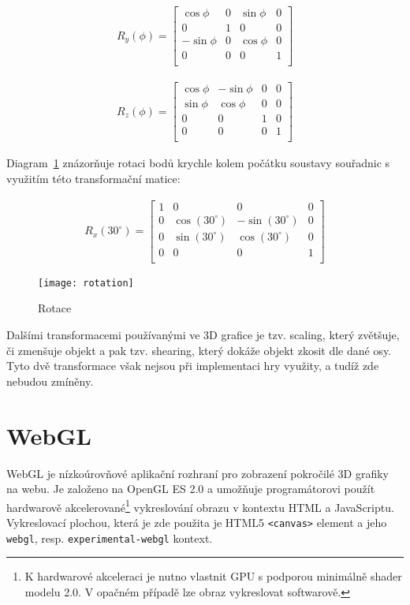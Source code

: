 \begin{align}
R_y(\phi) = 
\begin{bmatrix*}
\cos\phi & 0 & \sin\phi & 0 \\
0 & 1 & 0 & 0 \\
-\sin\phi & 0 & \cos\phi & 0 \\
0 & 0 & 0 & 1 \\
\end{bmatrix*}
\end{align}

\begin{align}
R_z(\phi) = 
\begin{bmatrix*}
\cos\phi & -\sin\phi & 0 & 0 \\
\sin\phi & \cos\phi & 0 & 0 \\
0 & 0 & 1 & 0 \\
0 & 0 & 0 & 1 \\
\end{bmatrix*}
\end{align}

Diagram~\ref{fig:rotation} znázorňuje rotaci bodů krychle kolem počátku soustavy souřadnic s využitím této transformační matice:

\begin{align}
R_x(30^{\circ}) = 
\begin{bmatrix*}
1 & 0 & 0 & 0 \\
0 & \cos(30^{\circ}) & -\sin(30^{\circ}) & 0 \\
0 & \sin(30^{\circ}) & \cos(30^{\circ}) & 0 \\
0 & 0 & 0 & 1 \\
\end{bmatrix*}
\end{align}

\begin{figure}[htb]
\centering
\texttt{[image: rotation]}
\caption{Rotace}
\label{fig:rotation}
\end{figure}

Dalšími transformacemi používanými ve 3D grafice je tzv. scaling, který zvětšuje, či zmenšuje objekt a pak tzv. shearing, který dokáže objekt zkosit dle dané osy. Tyto dvě transformace však nejsou při implementaci hry využity, a tudíž zde nebudou zmíněny.

\pagebreak
\section{WebGL}
\label{section:webgl}
WebGL je nízkoúrovňové aplikační rozhraní pro zobrazení pokročilé 3D grafiky na webu. Je založeno na OpenGL ES 2.0 a umožňuje programátorovi použít hardwarově akcelerované\footnote{K hardwarové akceleraci je nutno vlastnit GPU s podporou minimálně shader modelu 2.0. V opačném případě lze obraz vykreslovat softwarově.} vykreslování obrazu v kontextu HTML a JavaScriptu. Vykreslovací plochou, která je zde použita je HTML5 \texttt{<canvas>} element a jeho \texttt{webgl}, resp. \texttt{experimental-webgl} kontext.~\cite{seidelin2011html5}

